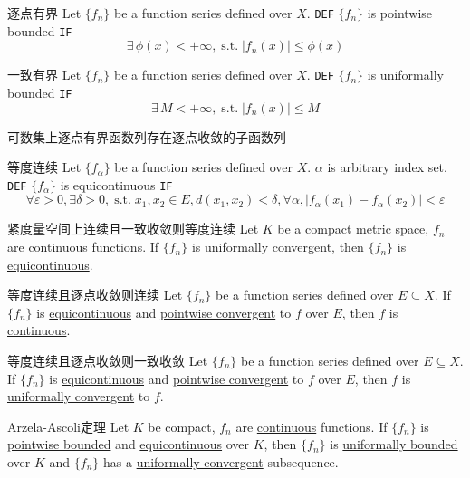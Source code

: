 \documentclass[UTF8]{ctexart}
\DeclareMathOperator{\st}{\text{s.t. }}
\begin{document}
            \begin{dfn}
                [PointwiseBounded]
                {逐点有界}
                Let $\{f_n\}$ be a function series defined over $X$. \texttt{DEF} $\{f_n\}$ is pointwise bounded \texttt{IF}
                \[\exists\,\phi(x)<+\infty, \st |f_n(x)|\leq\phi(x)\]
            \end{dfn}
            \begin{dfn}
                [UniBounded]
                {一致有界}
                Let $\{f_n\}$ be a function series defined over $X$. \texttt{DEF} $\{f_n\}$ is uniformally bounded \texttt{IF}
                \[\exists\,M<+\infty, \st |f_n(x)|\leq M\]
            \end{dfn}
            \begin{thm}
                [132701]
                {可数集上逐点有界函数列存在逐点收敛的子函数列}
            \end{thm}
            \begin{dfn}
                [EquiCont]
                {等度连续}
                Let $\{f_\alpha\}$ be a function series defined over $X$. $\alpha$ is arbitrary index set. \texttt{DEF} $\{f_\alpha\}$ is equicontinuous \texttt{IF}
                \[\forall\varepsilon>0,\exists\delta>0,\st x_1,x_2\in E, d(x_1,x_2)<\delta, \forall\alpha, |f_\alpha(x_1)-f_\alpha(x_2)|<\varepsilon\]
            \end{dfn}
            \begin{thm}
                {紧度量空间上连续且一致收敛则等度连续}
                Let $K$ be a compact metric space, $f_n$ are \hyperref[dfn:Cont]{continuous} functions. If $\{f_n\}$ is \hyperref[dfn:UniCont]{uniformally convergent}, then $\{f_n\}$ is \hyperref[dfn:EquiCont]{equicontinuous}.
            \end{thm}
            \begin{ppt}
                {等度连续且逐点收敛则连续}
                Let $\{f_n\}$ be a function series defined over $E\subseteq X$. If $\{f_n\}$ is \hyperref[dfn:EquiCont]{equicontinuous} and \hyperref[dfn:Real.PointwiseConv]{pointwise convergent} to $f$ over $E$, then $f$ is \hyperref[dfn:Cont]{continuous}.
            \end{ppt}
            \begin{ppt}
                {等度连续且逐点收敛则一致收敛}
                Let $\{f_n\}$ be a function series defined over $E\subseteq X$. If $\{f_n\}$ is \hyperref[dfn:EquiCont]{equicontinuous} and \hyperref[dfn:Real.PointwiseConv]{pointwise convergent} to $f$ over $E$, then $f$ is \hyperref[dfn:Metric.UniConv]{uniformally convergent} to $f$.
            \end{ppt}
            \begin{thm}
                [Arzela]
                {Arzela-Ascoli定理}
                Let $K$ be compact, $f_n$ are \hyperref[dfn:Cont]{continuous} functions. If $\{f_n\}$ is \hyperref[dfn:PointwiseBounded]{pointwise bounded} and \hyperref[dfn:EquiCont]{equicontinuous} over $K$, then $\{f_n\}$ is \hyperref[dfn:UniBounded]{uniformally bounded} over $K$ and $\{f_n\}$ has a \hyperref[dfn:UniCont]{uniformally convergent} subsequence.
            \end{thm}
\end{document}
